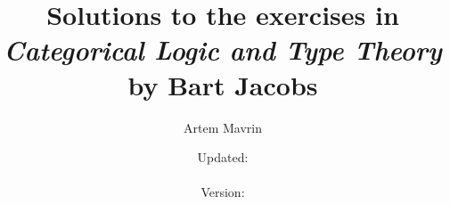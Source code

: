 \usepackage{defs}

\title{\texorpdfstring{%
Solutions to the exercises in\\
\emph{Categorical Logic and Type Theory}\\
by Bart Jacobs}%
{Categorical Logic and Type Theory Solutions}}
\author{Artem Mavrin}
\date{%
\small Updated: \texttt{\DTMNow}\\%
\faGithub\, \href{https://github.com/\gitreponame}{\texttt{\gitreponame}}\\%
Version: \href{https://github.com/\gitreponame/commit/\gitcommithash}{\texttt{\gitcommithash}}%
}


